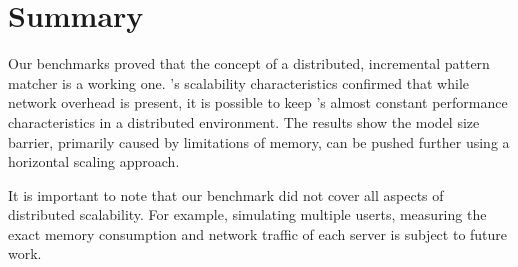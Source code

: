\section{Summary}



Our benchmarks proved that the concept of a distributed, incremental pattern matcher is a working one. \iqd{}'s scalability characteristics confirmed that while network overhead is present, it is possible to keep \eiq{}'s almost constant performance characteristics in a distributed environment. The results show the model size barrier, primarily caused by limitations of memory, %
can be pushed further using a horizontal scaling approach.

It is important to note that our benchmark did not cover all aspects of distributed scalability. For example, simulating multiple userts, measuring the exact memory consumption and network traffic of each server is subject to future work.
 

